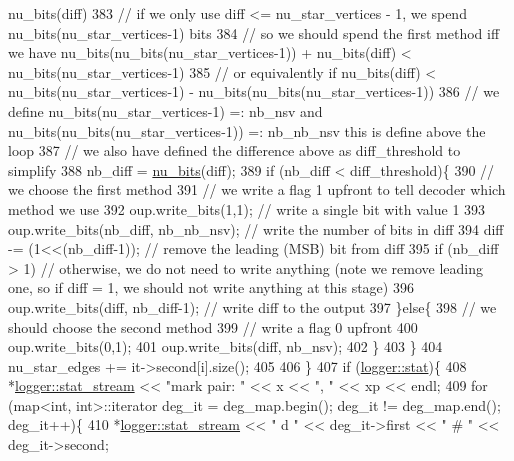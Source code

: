 \begin{DoxyCode}
{       nu\_bits(diff)}
383         \textcolor{comment}{// if we only use diff <= nu\_star\_vertices - 1, we spend nu\_bits(nu\_star\_vertices-1) bits}
384         \textcolor{comment}{// so we should spend the first method iff we have nu\_bits(nu\_bits(nu\_star\_vertices-1)) +
       nu\_bits(diff) < nu\_bits(nu\_star\_vertices-1)}
385         \textcolor{comment}{// or equivalently if nu\_bits(diff) < nu\_bits(nu\_star\_vertices-1) -
       nu\_bits(nu\_bits(nu\_star\_vertices-1))}
386         \textcolor{comment}{// we define  nu\_bits(nu\_star\_vertices-1) =: nb\_nsv and nu\_bits(nu\_bits(nu\_star\_vertices-1)) =:
       nb\_nb\_nsv this is define above the loop}
387         \textcolor{comment}{// we also have defined the difference above as diff\_threshold to simplify}
388         nb\_diff = \hyperlink{bitstream_8cpp_a9dfce6f51e3febb3973aa3b16c2fecb4}{nu\_bits}(diff);
389         \textcolor{keywordflow}{if} (nb\_diff < diff\_threshold)\{
390           \textcolor{comment}{// we choose the first method}
391           \textcolor{comment}{// we write a flag 1 upfront to tell decoder which method we use}
392           oup.write\_bits(1,1); \textcolor{comment}{// write a single bit with value 1}
393           oup.write\_bits(nb\_diff, nb\_nb\_nsv); \textcolor{comment}{// write the number of bits in diff }
394           diff -= (1<<(nb\_diff-1)); \textcolor{comment}{// remove the leading (MSB) bit from diff}
395           \textcolor{keywordflow}{if} (nb\_diff > 1) \textcolor{comment}{// otherwise, we do not need to write anything (note we remove leading one, so
       if diff = 1, we should not write anything at this stage)}
396             oup.write\_bits(diff, nb\_diff-1); \textcolor{comment}{// write diff to the output}
397         \}\textcolor{keywordflow}{else}\{
398           \textcolor{comment}{// we should choose the second method}
399           \textcolor{comment}{// write a flag 0 upfront}
400           oup.write\_bits(0,1);
401           oup.write\_bits(diff, nb\_nsv);
402         \}
403       \}
404       nu\_star\_edges += it->second[i].size();
405       
406     \}
407     \textcolor{keywordflow}{if} (\hyperlink{classlogger_a26812b5ba03f130e8dae3446d5fc032f}{logger::stat})\{
408       *\hyperlink{classlogger_a7db37821f875f2ba3540980b355779f5}{logger::stat\_stream} << \textcolor{stringliteral}{"mark pair: "} <<  x << \textcolor{stringliteral}{", "} << xp << endl;
409       \textcolor{keywordflow}{for} (map<int, int>::iterator deg\_it = deg\_map.begin(); deg\_it != deg\_map.end(); deg\_it++)\{
410         *\hyperlink{classlogger_a7db37821f875f2ba3540980b355779f5}{logger::stat\_stream} << \textcolor{stringliteral}{" d "} << deg\_it->first << \textcolor{stringliteral}{" # "} << deg\_it->second;

\end{DoxyCode}
